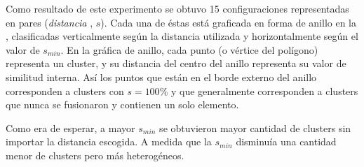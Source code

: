 \par Como resultado de este experimento se obtuvo 15 configuraciones representadas en pares (\emph{distancia} , $s$). Cada una de éstas está graficada en forma de anillo en la , clasificadas verticalmente según la distancia utilizada y horizontalmente según el valor de $s_{min}$. En la gráfica de anillo, cada punto (o vértice del polígono) representa un cluster, y su distancia del centro del anillo representa su valor de similitud interna. Así los puntos que están en el borde externo del anillo corresponden a clusters con $s=100\%$ y que generalmente corresponden a clusters que nunca se fusionaron y contienen un solo elemento. 
\par Como era de esperar, a mayor $s_{min}$ se obtuvieron mayor cantidad de clusters sin importar la distancia escogida. A medida que la $s_{min}$ disminuía una cantidad menor de clusters pero más heterogéneos. 


